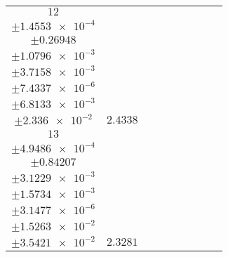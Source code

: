 \documentclass[8pt]{article}
\begin{document}
\begin{longtable}[l]{c c c c c c c c c}
$\num{12}$ & \begin{tabular}[c]{@{}c@{}}$\num{3.0915e-2}$ \\ $\pm\num{1.4553e-4}$\end{tabular} & \begin{tabular}[c]{@{}c@{}}$\num{-0.85558}$ \\ $\pm\num{0.26948}$\end{tabular} & \begin{tabular}[c]{@{}c@{}}$\num{-11.307}$ \\ $\pm\num{1.0796e-3}$\end{tabular} & \begin{tabular}[c]{@{}c@{}}$\num{1.598e+3}$ \\ $\pm\num{3.7158e-3}$\end{tabular} & \begin{tabular}[c]{@{}c@{}}$\num{3.1969}$ \\ $\pm\num{7.4337e-6}$\end{tabular} & \begin{tabular}[c]{@{}c@{}}$\num{1.1936}$ \\ $\pm\num{6.8133e-3}$\end{tabular} & \begin{tabular}[c]{@{}c@{}}$\num{4.283}$ \\ $\pm\num{2.336e-2}$\end{tabular} & $\num{2.4338}$\\
$\num{13}$ & \begin{tabular}[c]{@{}c@{}}$\num{2.7479e-2}$ \\ $\pm\num{4.9486e-4}$\end{tabular} & \begin{tabular}[c]{@{}c@{}}$\num{-1.0087}$ \\ $\pm\num{0.84207}$\end{tabular} & \begin{tabular}[c]{@{}c@{}}$\num{-7.094}$ \\ $\pm\num{3.1229e-3}$\end{tabular} & \begin{tabular}[c]{@{}c@{}}$\num{1.6022e+3}$ \\ $\pm\num{1.5734e-3}$\end{tabular} & \begin{tabular}[c]{@{}c@{}}$\num{3.2052}$ \\ $\pm\num{3.1477e-6}$\end{tabular} & \begin{tabular}[c]{@{}c@{}}$\num{1.1161}$ \\ $\pm\num{1.5263e-2}$\end{tabular} & \begin{tabular}[c]{@{}c@{}}$\num{3.9947}$ \\ $\pm\num{3.5421e-2}$\end{tabular} & $\num{2.3281}$\\

\end{longtable}
\end{document}
